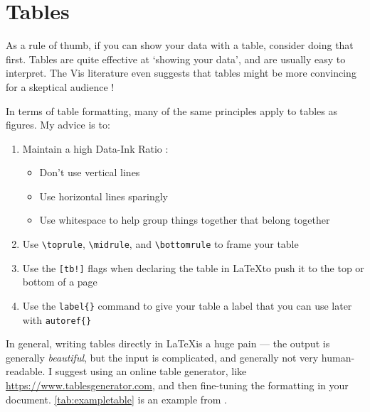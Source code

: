 %
%
\newpage
\section{Tables}
\label{sec:tables}

As a rule of thumb, if you can show your data with a table, consider doing that first. Tables are quite effective at `showing your data', and are usually easy to interpret. The Vis literature even suggests that tables might be more convincing for a skeptical audience \citep{pandey2014persuasive}!

In terms of table formatting, many of the same principles apply to tables as figures. My advice is to: 

\begin{enumerate}
    \item Maintain a high Data-Ink Ratio \citep{tufte1983visual}: 
        \begin{itemize}
            \item Don't use vertical lines
            \item Use horizontal lines sparingly
            \item Use whitespace to help group things together that belong together
        \end{itemize}
    \item Use \texttt{\textbackslash toprule}, \texttt{\textbackslash midrule}, and \texttt{\textbackslash bottomrule} to frame your table
    \item Use the \texttt{[tb!]} flags when declaring the table in \LaTeX to push it to the top or bottom of a page
    \item Use the \texttt{label\{\}} command to give your table a label that you can use later with \texttt{autoref\{\}}
\end{enumerate}
%
In general, writing tables directly in \LaTeX is a huge pain --- the output is generally \emph{beautiful}, but the input is complicated, and generally not very human-readable. I suggest using an online table generator, like \href{https://www.tablesgenerator.com}{https://www.tablesgenerator.com}, and then fine-tuning the formatting in your document. \autoref{tab:exampletable} is an example from \citet{wallace2013}. 

